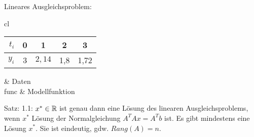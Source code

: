 \begin{minipage}[tc]{\linewidth}
	Lineares Ausgleichsproblem:
	\begin{tabular}{cl}
		\begin{tabular}{r|c|c|c|c}
			$t_i$ & 0 & 1 & 2 & 3 \\ 
			\hline 
			$y_i$ & 3 & $2,14$ & 1,8 & 1,72 \\ 
		\end{tabular}  & Daten \\ 
		func & Modellfunktion \\ 
	\end{tabular} 
\end{minipage}

\begin{minipage}[tc]{\linewidth}
	Satz: 1.1: \linebreak[3]
	$x^*\in {\mathbb R}$ ist genau dann eine Lösung des linearen Ausgleichsproblems, 
	wenn $x^*$ Lösung der Normalgleichung $A^TAx = A^Tb$ ist.
	Es gibt mindestens eine Lösung $x^*$.
	Sie ist eindeutig, gdw. $Rang(A) = n$.
\end{minipage}

